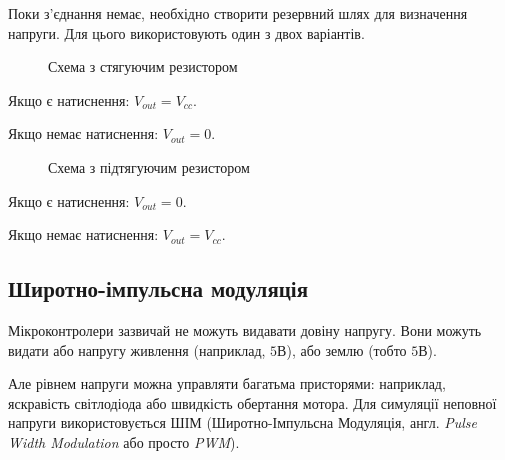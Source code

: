 \documentclass[12pt,a4paper]{book}  %
\begin{document}
Поки з'єднання немає, необхідно створити резервний шлях для визначення напруги. Для цього використовують один з двох варіантів.

\begin{figure}[h!]
\caption{Схема з стягуючим резистором}
\label{ris:image}
\end{figure}

Якщо є натиснення: $V_{out} = V_{cc}$.

Якщо немає натиснення: $V_{out} = 0$.


\begin{figure}[h!]
\caption{Схема з підтягуючим резистором}
\label{ris:image}
\end{figure}

Якщо є натиснення: $V_{out} = 0$.

Якщо немає натиснення: $V_{out} = V_{cc}$.

\subsection{Широтно-імпульсна модуляція}

Мікроконтролери зазвичай не можуть видавати довіну напругу. Вони можуть видати або напругу живлення (наприклад, $5\text{В}$), або землю (тобто $5\text{В}$).

Але рівнем напруги можна управляти багатьма присторями: наприклад, яскравість світлодіода або швидкість обертання мотора. Для симуляції неповної напруги використовується ШІМ (Широтно-Імпульсна Модуляція, англ. \textit{Pulse Width Modulation} або просто \textit{PWM}).
\end{document}
